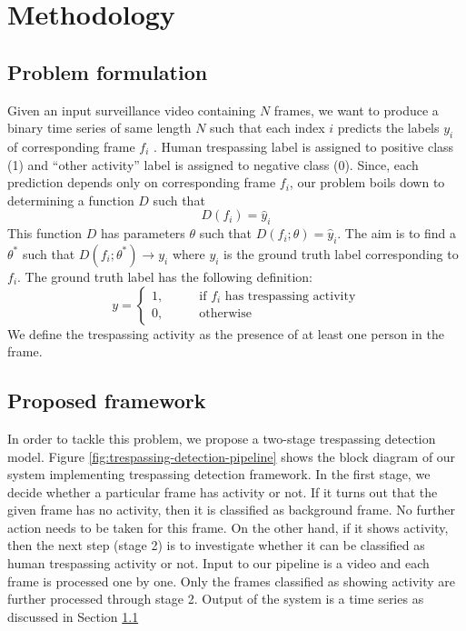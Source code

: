 \section{Methodology}
\label{sec:methodology}
\subsection{Problem formulation}
\label{sec:prob-formulation}
Given an input surveillance video containing $N$ frames, we want to produce a binary time series of same length $N$ such that each index $i$ predicts the labels $y_i$ of corresponding frame $f_i$ . Human trespassing label is assigned to positive class (1) and ``other activity'' label is assigned to negative class (0). Since, each prediction depends only on corresponding frame $f_i$, our problem boils down to determining a function $D$ such that 
$$ D(f_i) = \hat{y}_i $$
This function $D$ has parameters $\theta$ such that $D(f_i;\theta) = \hat{y}_i$. The aim is to find a $\theta^*$ such that $D(f_i;\theta^*) \rightarrow y_i$ where $y_i$ is the ground truth label corresponding to $f_i$. The ground truth label has the following definition: 
$$y=
\begin{cases}
1,  &\qquad \textrm{if } f_i \textrm{ has trespassing activity} \\ 
0, 	&\qquad \textrm{otherwise}
\end{cases}
$$
We define the trespassing activity as the presence of at  least one person in the frame. 

\subsection{Proposed framework}
\label{sec:proposed-framework}
In order to tackle this problem, we propose a two-stage trespassing detection model. 
Figure \ref{fig:trespassing-detection-pipeline} shows the block diagram of our system implementing trespassing detection framework. In the first stage, we decide whether a particular frame has activity or not. If it turns out that the given frame has no activity, then it is classified as background frame. No further action needs to be taken for this frame. On the other hand, if it shows activity, then the next step (stage 2) is to investigate whether it can be classified as human trespassing activity or not. Input to our pipeline is a video and each frame is processed one by one. Only the frames classified as showing activity are further processed through stage 2. Output of the system is a time series as discussed in Section \ref{sec:prob-formulation}

